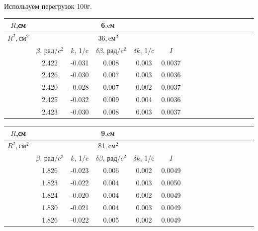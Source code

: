 \documentclass[14pt]{article}
\begin{document}
\vspace{5cm}
\noindent Используем перегрузок 100г.


\begin{center}
\begin{tabular}{|c|c|c|c|c|c|c|c|c|c|c|c|c|c|c|c|}
\hline
$R$,см	&	\multicolumn{5}{|c|}{6$, \text{cм}$}			\\
\hline
$R^2, \text{см}^2$	&	\multicolumn{5}{|c|}{36$, \text{cм}^2$}			\\
\hline
		&	$\beta$, рад/$c^2$	&	$k$, 1/c	&	$\delta\beta$, рад/$c^2$	&	$\delta k$, 1/c		&	$I$		\\
\hline
		&	2.422				&	-0.031		&	0.008						&	0.003				&	0.0037	\\
\hline
		&	2.426				&	-0.030		&	0.007						&	0.003				&	0.0036	\\
\hline
		&	2.420				&	-0.028		&	0.007						&	0.002				&	0.0037	\\
\hline
		&	2.425				&	-0.032		&	0.009						&	0.004				&	0.0036	\\
\hline
		&	2.423				&	-0.030		&	0.008						&	0.003				&	0.0037	\\
\hline
\end{tabular}
\end{center}

\begin{center}
\begin{tabular}{|c|c|c|c|c|c|c|c|c|c|c|c|c|c|c|c|}
\hline
$R$,см	&	\multicolumn{5}{|c|}{9$, \text{cм}$}			\\
\hline
$R^2, \text{см}^2$	&	\multicolumn{5}{|c|}{81$, \text{cм}^2$}			\\
\hline
		&	$\beta$, рад/$c^2$	&	$k$, 1/c	&	$\delta\beta$, рад/$c^2$	&	$\delta k$, 1/c		&	$I$		\\
\hline
		&	1.826				&	-0.023		&	0.006						&	0.002				&	0.0049	\\
\hline
		&	1.823				&	-0.022		&	0.004						&	0.003				&	0.0050	\\
\hline
		&	1.824				&	-0.020		&	0.004						&	0.002				&	0.0049	\\
\hline
		&	1.830				&	-0.021		&	0.004						&	0.003				&	0.0049	\\
\hline
		&	1.826				&	-0.022		&	0.005						&	0.002				&	0.0049	\\
\hline
\end{tabular}
\end{center}
\end{document}
